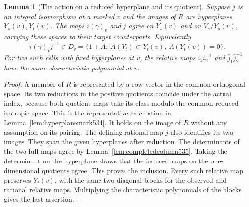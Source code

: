 \documentclass[a4paper,11pt]{article}
\newtheorem{lemma}[proposition]{Lemma}
\theoremstyle{definition}
\theoremstyle{remark}
\numberwithin{equation}{section}
\begin{document}
\begin{lemma}[The action on a reduced hyperplane and its quotient]
\leavevmode\label{lem:parabolic537}
Suppose \(j\) is an integral isomorphism at a marked \(v\) and
the images of \(R\) are hyperplanes \(Y_s(v),Y_t(v)\).
The maps \(i(\gamma)_v\) and \(\bar j\) agree on \(Y_s(v)\)
and on \(V_s/Y_s(v)\), carrying these spaces to their target
counterparts. Equivalently
\[
 i(\gamma)_v\bar j^{-1}\in
 D_v=\{1+A:\ A(V_t)\subset Y_t(v),\ A(Y_t(v))=0\}.
\]
For two such cells with fixed hyperplanes at \(v\), the relative
maps \(i_1 i_2^{-1}\) and \(\bar j_1\bar j_2^{-1}\) have the
same characteristic polynomial at \(v\).
\end{lemma}
\begin{proof}
A member of \(R\) is represented by a row vector in the common
orthogonal space. Its two reductions in the positive quotients
coincide under the actual index, because both quotient maps take
its class modulo the common reduced isotropic space. This is the
representative calculation in Lemma~\ref{lem:hyperplanemark534}.
It holds on the image of \(R\) without any assumption on its
pairing. The defining rational map \(j\) also identifies its
two images. They span the given hyperplanes after reduction.
The determinants of the two full maps agree by
Lemma~\ref{lem:completedcolumn535}. Taking the determinant on
the hyperplane shows that the induced maps on the
one-dimensional quotients agree. This proves the inclusion.
Every such relative map preserves \(Y_t(v)\), with the same
two diagonal blocks for the observed and rational relative maps.
Multiplying the characteristic polynomials of the blocks gives
the last assertion.
\end{proof}
\end{document}

